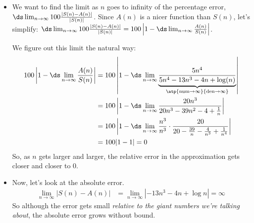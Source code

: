 \begin{solution}
\begin{itemize}
\item We want to find the limit as $n$ goes to infinity of the percentage error,
$\ds\lim_{n \rightarrow \infty} 100\frac{|S(n)-A(n)|}{|S(n)|}$. Since $A(n)$ is a nicer function than $S(n)$, let's simplify: $\ds\lim_{n \rightarrow \infty} 100\frac{|S(n)-A(n)|}{|S(n)|} = 100\left|1-\ds\lim_{n \to \infty}\frac{A(n)}{S(n)}\right|$.

We  figure out this limit the natural way:
\begin{align*}
100\left|1-\ds\lim_{n \to \infty}\frac{A(n)}{S(n)}\right|&=
100\left|1-\ds\lim_{n \rightarrow \infty}\underbrace{\frac{5n^4}{5n^4-13n^3-4n+\log (n)}}_{\atp
	{\mathrm{num}\to\infty}
	{\mathrm{den}\to\infty}}\right|\\
&=
100\left|1-\ds\lim_{n \rightarrow \infty}\frac{20n^3}{20n^3-39n^2-4+\frac{1}{n}}\right|\\
&=
100\left|1-\ds\lim_{n \rightarrow \infty}\frac{n^3}{n^3}\cdot\frac{20}{20-\frac{39}{n}-\frac{4}{n^3}+\frac{1}{n^4}}\right|\\
&=100|1-1|=0
\end{align*}
So, as $n$ gets larger and larger, the relative error in the approximation gets closer and closer to 0.

\item Now, let's look at the absolute error.
\begin{align*}
\lim_{n \rightarrow \infty} \left| S(n)-A(n)\right|&=\lim_{n \rightarrow \infty} |-13n^3-4n+\log n|=\infty
\end{align*}
So although the error gets small \emph{relative to the giant numbers we're talking about}, the absolute error grows without bound.
\end{itemize}
\end{solution}
